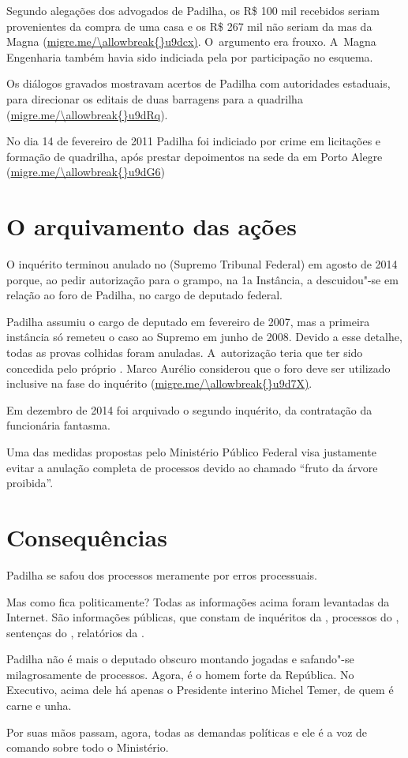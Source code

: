 Segundo alegações dos advogados de Padilha, os R\$ 100 mil recebidos
seriam provenientes da compra de uma casa e os R\$ 267 mil não seriam da
 mas da Magna (\url{migre.me/\allowbreak{}u9dcx)}. O~argumento era frouxo.
A~Magna Engenharia também havia sido indiciada pela  por participação
no esquema.

Os diálogos gravados mostravam acertos de Padilha com autoridades
estaduais, para direcionar os editais de duas barragens para a quadrilha
(\url{migre.me/\allowbreak{}u9dRq}).

No dia 14 de fevereiro de 2011 Padilha foi indiciado por crime em
licitações e formação de quadrilha, após prestar depoimentos na sede da
 em Porto Alegre (\url{migre.me/\allowbreak{}u9dG6})

\section{O arquivamento das ações}

O inquérito terminou anulado no  (Supremo Tribunal Federal) em agosto
de 2014 porque, ao pedir autorização para o grampo, na 1a Instância, a
 descuidou"-se em relação ao foro de Padilha, no cargo de deputado
federal.

Padilha assumiu o cargo de deputado em fevereiro de 2007, mas a primeira
instância só remeteu o caso ao Supremo em junho de 2008. Devido a esse
detalhe, todas as provas colhidas foram anuladas. A~autorização teria
que ter sido concedida pelo próprio . Marco Aurélio considerou que o
foro deve ser utilizado inclusive na fase do inquérito
(\url{migre.me/\allowbreak{}u9d7X)}.

Em dezembro de 2014 foi arquivado o segundo inquérito, da contratação da
funcionária fantasma.

Uma das medidas propostas pelo Ministério Público Federal visa
justamente evitar a anulação completa de processos devido ao chamado
``fruto da árvore proibida''.

\section{Consequências}

Padilha se safou dos processos meramente por erros processuais.

Mas como fica politicamente? Todas as informações acima foram levantadas
da Internet. São informações públicas, que constam de inquéritos da ,
processos do , sentenças do , relatórios da .

Padilha não é mais o deputado obscuro montando jogadas e safando"-se
milagrosamente de processos. Agora, é o homem forte da República. No
Executivo, acima dele há apenas o Presidente interino Michel Temer, de
quem é carne e unha.

Por suas mãos passam, agora, todas as demandas políticas e ele é a voz
de comando sobre todo o Ministério.
